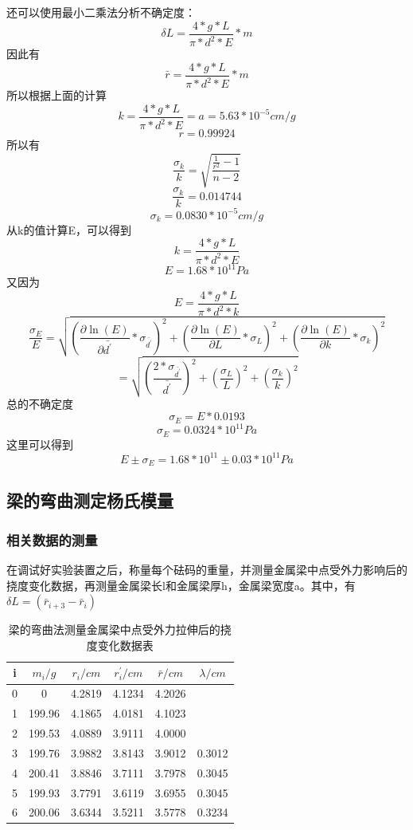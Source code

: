 \documentclass[a4paper,11pt]{article}
\begin{document}
\begin{enumerate}
	还可以使用最小二乘法分析不确定度：\\
	$$ \delta L = \dfrac{4 * g *L}{\pi * d^2 *E} * m $$
	因此有
	$$ \bar{r} = \dfrac{4 * g *L}{\pi * d^2 *E} * m $$
	所以根据上面的计算
	$$ k = \dfrac{4 * g *L}{\pi * d^2 *E} = a = 5.63 * 10^{-5} cm/g $$
	$$ r = 0.99924 $$
	所以有
	$$ \dfrac{\sigma_k}{k} = \sqrt{\dfrac{\frac{1}{r^2} - 1}{n-2}} $$
	$$ \dfrac{\sigma_k}{k} = 0.014744 $$
	$$ \sigma_k = 0.0830 * 10^{-5} cm/g $$
	从k的值计算E，可以得到
	$$ k = \dfrac{4 * g *L}{\pi * d^2 *E} $$
	$$ E = 1.68 * 10^{11} Pa $$
	又因为
	$$ E = \dfrac{4 * g *L}{\pi * d^2 *k} $$
	$$ \dfrac{\sigma_{E}}{E} = \sqrt{(\dfrac{\partial \ln(E)}{\partial \bar{d^{\prime}}} * \sigma_{\bar{d^{\prime}}})^{2}  + (\dfrac{\partial \ln(E)}{\partial L} * \sigma_{L})^{2} + (\dfrac{\partial \ln(E)}{\partial k} * \sigma_{k})^{2} } $$
	$$ = \sqrt{(\dfrac{2 * \sigma_{\bar{d^{\prime}}}}{\bar{d^{\prime}}})^{2}   + (\dfrac{\sigma_{L}}{L})^{2}  + (\dfrac{\sigma_{k}}{k})^{2}  } $$
	总的不确定度
	$$ \sigma_{E} = E * 0.0193  $$
	$$ \sigma_{E} = 0.0324 * 10^{11} Pa  $$
	这里可以得到
	$$ E\pm \sigma_E = 1.68 * 10^{11} \pm 0.03 * 10^{11} Pa $$ 
	
\end{enumerate}

\subsection{梁的弯曲测定杨氏模量}
\subsubsection{相关数据的测量}
在调试好实验装置之后，称量每个砝码的重量，并测量金属梁中点受外力影响后的挠度变化数据，再测量金属梁长l和金属梁厚h，金属梁宽度a。其中，有$ \delta L = (\bar{r}_{i+3} - \bar{r}_{i})  $ 
\begin{table}[H]
	\centering\caption{梁的弯曲法测量金属梁中点受外力拉伸后的挠度变化数据表}
	\small
	\begin{tabularx}{.85\linewidth}{C{1} *5{C{1}}}
		\toprule
		\textbf{i} &
		$ m_{i}/g $ &
		$ r_{i}/cm $ &
		$ r_{i}^{\prime}/cm $ &
		$ \bar{r}/cm $ &
		$ \lambda  /cm $\\
		     & 0  & 4.2819 & 4.1234 &  4.2026 &     \\
		1     & 199.96  & 4.1865 & 4.0181 &  4.1023 &     \\
		2     & 199.53  & 4.0889 & 3.9111 &  4.0000 &     \\
		3     & 199.76  & 3.9882 & 3.8143 &  3.9012 & 0.3012    \\
		4     & 200.41  & 3.8846 & 3.7111 &  3.7978 & 0.3045    \\
		5     & 199.93  & 3.7791 & 3.6119 &  3.6955 & 0.3045    \\
		6     & 200.06  & 3.6344 & 3.5211 &  3.5778 & 0.3234    \\
		\bottomrule
	\end{tabularx}
	\vspace{3ex}
\end{table}\noindent%
\end{document}
